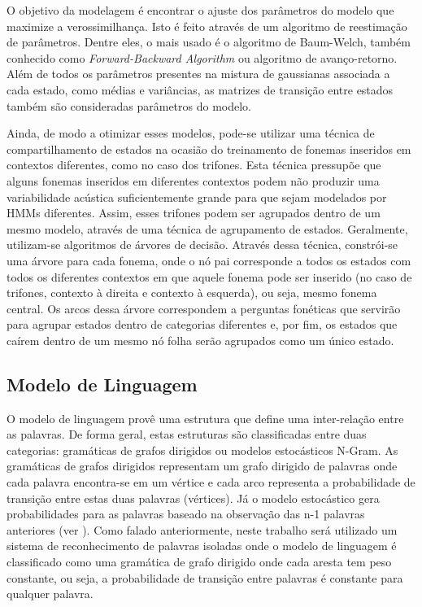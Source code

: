 \documentclass[12pt,a4paper,oneside]{report}
\begin{document}
O objetivo da modelagem é encontrar o ajuste dos parâmetros do modelo que maximize a verossimilhança. Isto é feito através de um algoritmo de reestimação de parâmetros. Dentre eles, o mais usado é o algoritmo de Baum-Welch, também conhecido como \emph{Forward-Backward Algorithm} ou algoritmo de avanço-retorno. Além de todos os parâmetros presentes na mistura de gaussianas associada a cada estado, como médias e variâncias, as matrizes de transição entre estados também são consideradas parâmetros do modelo.

Ainda, de modo a otimizar esses modelos, pode-se utilizar uma técnica de compartilhamento de estados na ocasião do treinamento de fonemas inseridos em contextos diferentes, como no caso dos trifones. Esta técnica pressupõe que alguns fonemas inseridos em diferentes contextos podem não produzir uma variabilidade acústica suficientemente grande para que sejam modelados por HMMs diferentes. Assim, esses trifones podem ser agrupados dentro de um mesmo modelo, através de uma técnica de agrupamento de estados. Geralmente, utilizam-se algoritmos de árvores de decisão.
Através dessa técnica, constrói-se uma árvore para cada fonema, onde o nó pai corresponde a todos os estados com todos os diferentes contextos em que aquele fonema pode ser inserido (no caso de trifones, contexto à direita e contexto à esquerda), ou seja, mesmo fonema central. Os arcos dessa árvore correspondem a perguntas fonéticas que servirão para agrupar estados dentro de categorias diferentes e, por fim, os estados que caírem dentro de um mesmo nó folha serão agrupados como um único estado.

\subsection{Modelo de Linguagem}

O modelo de linguagem provê uma estrutura que define uma inter-relação entre as palavras. De forma geral, estas estruturas são classificadas entre duas categorias: gramáticas de grafos dirigidos ou modelos estocásticos N-Gram. As gramáticas de grafos dirigidos representam um grafo dirigido de palavras onde cada palavra encontra-se em um vértice e cada arco representa a probabilidade de transição entre estas duas palavras (vértices). Já o modelo estocástico gera probabilidades para as palavras baseado na observação das n-1 palavras anteriores (ver \cite{fsr}). Como falado anteriormente, neste trabalho será utilizado um sistema de reconhecimento de palavras isoladas onde o modelo de linguagem é classificado como uma gramática de grafo dirigido onde cada aresta tem peso constante, ou seja, a probabilidade de transição entre palavras é constante para qualquer palavra.
\end{document}
